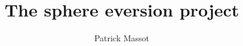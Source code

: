 \documentclass{report}
\title{The sphere eversion project}
\author{Patrick Massot}
\begin{document}
\maketitle

\collectproofs
\makegraph
\end{document}

